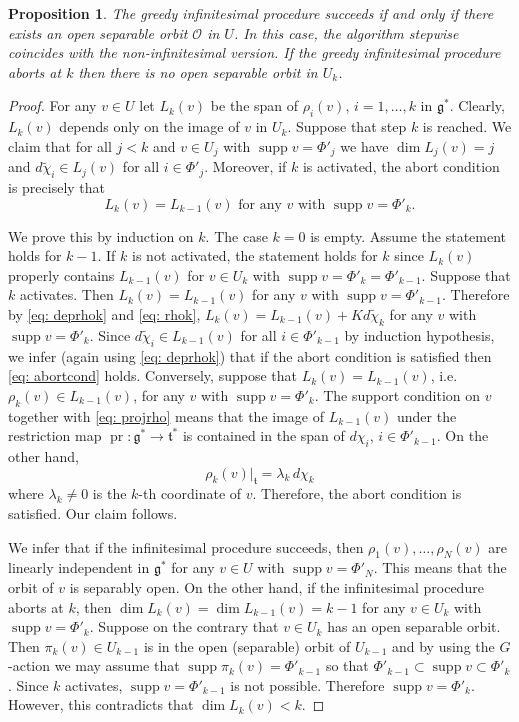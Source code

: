 \documentclass[12pt]{article}
\newtheorem{proposition}[theorem]{Proposition}
\newcommand{\Lieg}{\mathfrak{g}}
\newcommand{\Liet}{\mathfrak{t}}
\newcommand{\supp}{\operatorname{supp}}
\newcommand{\rest}{\big |}
\newcommand{\orbit}{\mathcal{O}}
\newcommand{\pr}{\operatorname{pr}}
\begin{document}
\begin{proposition} \label{prop: greedy}
The greedy infinitesimal procedure succeeds if and only if there exists an open separable orbit $\orbit$ in $U$.
In this case, the algorithm stepwise coincides with the non-infinitesimal version.
If the greedy infinitesimal procedure aborts at $k$ then there is no open separable orbit in $U_k$.
\end{proposition}

\begin{proof}
For any $v\in U$ let $L_k(v)$ be the span of $\rho_i(v)$, $i=1,\dots,k$ in $\Lieg^*$.
Clearly, $L_k(v)$ depends only on the image of $v$ in $U_k$.
Suppose that step $k$ is reached.
We claim that for all $j<k$ and $v\in U_j$ with $\supp v=\Phi'_j$ we have $\dim L_j(v)=j$ and
$d\tilde\chi_i\in L_j(v)$ for all $i\in\Phi'_j$. Moreover, if $k$ is activated, the abort condition is precisely that
\begin{equation} \label{eq: abortcond}
L_k(v)=L_{k-1}(v)\text{ for any $v$ with }\supp v=\Phi'_k.
\end{equation}

We prove this by induction on $k$. The case $k=0$ is empty. Assume the statement holds for $k-1$. If $k$ is not activated, the statement holds for $k$
since $L_k(v)$ properly contains $L_{k-1}(v)$ for $v\in U_k$ with $\supp v=\Phi'_k=\Phi'_{k-1}$.
Suppose that $k$ activates. Then $L_k(v)=L_{k-1}(v)$ for any $v$ with $\supp v=\Phi'_{k-1}$.
Therefore by \cref{eq: deprhok} and \cref{eq: rhok}, $L_k(v)=L_{k-1}(v)+K d\tilde\chi_k$ for any $v$ with $\supp v=\Phi'_k$.
Since $d\tilde\chi_i\in L_{k-1}(v)$ for all $i\in\Phi'_{k-1}$ by induction hypothesis, we infer (again using \cref{eq: deprhok})
that if the abort condition is satisfied then \cref{eq: abortcond} holds.
Conversely, suppose that $L_k(v)=L_{k-1}(v)$, i.e. $\rho_k(v)\in L_{k-1}(v)$, for any $v$ with $\supp v=\Phi'_k$.
The support condition on $v$ together with \cref{eq: projrho} means that the image of $L_{k-1}(v)$ under the restriction map $\pr:\Lieg^*\rightarrow\Liet^*$
is contained in the span of $d\chi_i$, $i\in\Phi'_{k-1}$.
On the other hand,
\[
\rho_k(v)\rest_{\Liet}=\lambda_k\,d\chi_k
\]
where $\lambda_k\ne0$ is the $k$-th coordinate of $v$. Therefore, the abort condition is satisfied.
Our claim follows.

We infer that if the infinitesimal procedure succeeds, then $\rho_1(v),\dots,\rho_N(v)$ are linearly independent in $\Lieg^*$
for any $v\in U$ with $\supp v=\Phi'_N$. This means that the orbit of $v$ is separably open.
On the other hand, if the infinitesimal procedure aborts at $k$, then $\dim L_k(v)=\dim L_{k-1}(v)=k-1$ for any $v\in U_k$
with $\supp v=\Phi'_k$. Suppose on the contrary that $v\in U_k$ has an open separable orbit.
Then $\pi_k(v)\in U_{k-1}$ is in the open (separable) orbit of $U_{k-1}$ and by using the $G$-action we may assume that $\supp\pi_k(v)=\Phi'_{k-1}$
so that $\Phi'_{k-1}\subset\supp v\subset\Phi'_k$. Since $k$ activates, $\supp v=\Phi'_{k-1}$ is not possible. Therefore $\supp v=\Phi'_k$.
However, this contradicts that $\dim L_k(v)<k$.


\end{proof}
\end{document}

